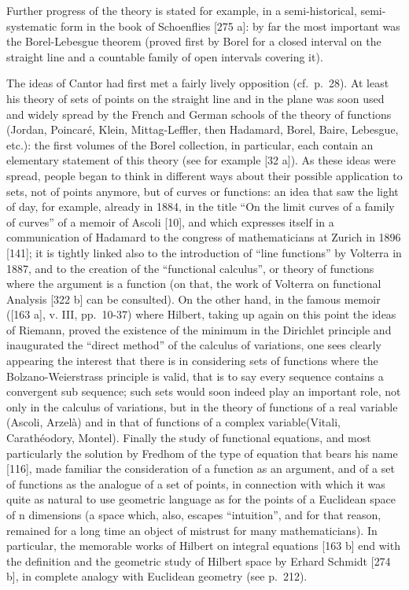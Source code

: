 Further progress of the theory is stated for example, in a semi-historical, semi-systematic form in the book of Schoenflies {[}275 a{]}: by far the most important was the Borel-Lebesgue theorem (proved first by Borel for a closed interval on the straight line and a countable family of open intervals covering it).

The ideas of Cantor had first met a fairly lively opposition (cf.~p.~28). At least his theory of sets of points on the straight line and in the plane was soon used and widely spread by the French and German schools of the theory of functions (Jordan, Poincaré, Klein, Mittag-Leffler, then Hadamard, Borel, Baire, Lebesgue, etc.): the first volumes of the Borel collection, in particular, each contain an elementary statement of this theory (see for example {[}32 a{]}). As these ideas were spread, people began to think in different ways about their possible application to sets, not of points anymore, but of curves or functions: an idea that saw the light of day, for example, already in 1884, in the title ``On the limit curves of a family of curves'' of a memoir of Ascoli {[}10{]}, and which expresses itself in a communication of Hadamard to the congress of mathematicians at Zurich in 1896 {[}141{]}; it is tightly linked also to the introduction of ``line functions'' by Volterra in 1887, and to the creation of the ``functional calculus'', or theory of functions where the argument is a function (on that, the work of Volterra on functional Analysis {[}322 b{]} can be consulted). On the other hand, in the famous memoir ({[}163 a{]}, v. III, pp.~10-37) where Hilbert, taking up again on this point the ideas of Riemann, proved the existence of the minimum in the Dirichlet principle and inaugurated the ``direct method'' of the calculus of variations, one sees clearly appearing the interest that there is in considering sets of functions where the Bolzano-Weierstrass principle is valid, that is to say every sequence contains a convergent sub sequence; such sets would soon indeed play an important role, not only in the calculus of variations, but in the theory of functions of a real variable (Ascoli, Arzelà) and in that of functions of a complex variable(Vitali, Carathéodory, Montel). Finally the study of functional equations, and most particularly the solution by Fredhom of the type of equation that bears his name {[}116{]}, made familiar the consideration of a function as an argument, and of a set of functions as the analogue of a set of points, in connection with which it was quite as natural to use geometric language as for the points of a Euclidean space of n dimensions (a space which, also, escapes ``intuition'', and for that reason, remained for a long time an object of mistrust for many mathematicians). In particular, the memorable works of Hilbert on integral equations {[}163 b{]} end with the definition and the geometric study of Hilbert space by Erhard Schmidt {[}274 b{]}, in complete analogy with Euclidean geometry (see p.~212).

